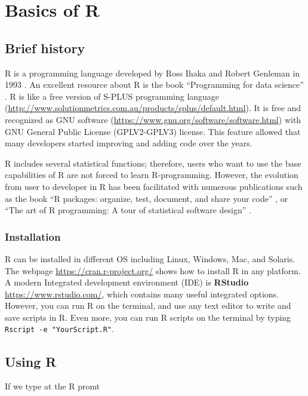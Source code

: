 \documentclass[12pt,graybox,envcountchap,sectrefs]{krantz}
\theoremstyle{definition}
\theoremstyle{definition}
\theoremstyle{definition}
\theoremstyle{remark}
\begin{document}
\chapter{Basics of R}\label{basic}

\section{Brief history}\label{brief-history}

R is a programming language developed by Ross Ihaka and Robert Genleman
in 1993 \citep{ihaka1996r}. An excellent resource about R is the book
``Programming for data science'' \citep{peng2015r}. R is like a free
version of S-PLUS programming language
(\url{http://www.solutionmetrics.com.au/products/splus/default.html}).
It is free and recognized as GNU software
(\url{https://www.gnu.org/software/software.html}) with GNU General
Public License (GPLV2-GPLV3) license. This feature allowed that many
developers started improving and adding code over the years.

R includes several statistical functions; therefore, users who want to
use the base capabilities of R are not forced to learn R-programming.
However, the evolution from user to developer in R has been facilitated
with numerous publications such as the book ``R packages: organize,
test, document, and share your code'' \citep{wickham2015r}, or ``The art
of R programming: A tour of statistical software design''
\citep{matloff2011art}.

\subsection{Installation}\label{installation-1}

R can be installed in different OS including Linux, Windows, Mac, and
Solaris. The webpage \url{https://cran.r-project.org/} shows how to
install R in any platform. A modern Integrated development environment
(IDE) is \textbf{RStudio} \url{https://www.rstudio.com/}, which contains
many useful integrated options. However, you can run R on the terminal,
and use any text editor to write and save scripts in R. Even more, you
can run R scripts on the terminal by typing
\texttt{Rscript\ -e\ "YourScript.R"}.

\section{Using R}\label{using-r}

If we type at the R promt
\end{document}
